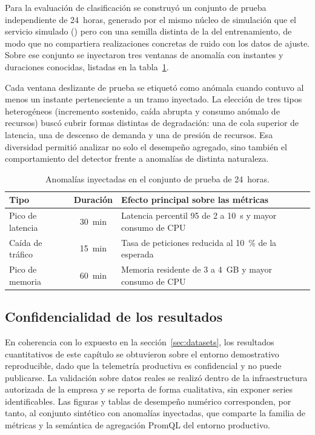 Para la evaluación de clasificación se construyó un conjunto de prueba independiente de 24~horas, generado por el mismo núcleo de simulación que el servicio simulado () pero con una semilla distinta de la del entrenamiento, de modo que no compartiera realizaciones concretas de ruido con los datos de ajuste. Sobre ese conjunto se inyectaron tres ventanas de anomalía con instantes y duraciones conocidas, listadas en la tabla~\ref{tab:anomalias-inyectadas}.

Cada ventana deslizante de prueba se etiquetó como anómala cuando contuvo al menos un instante perteneciente a un tramo inyectado. La elección de tres tipos heterogéneos (incremento sostenido, caída abrupta y consumo anómalo de recursos) buscó cubrir formas distintas de degradación: una de cola superior de latencia, una de descenso de demanda y una de presión de recursos. Esa diversidad permitió analizar no solo el desempeño agregado, sino también el comportamiento del detector frente a anomalías de distinta naturaleza.

\begin{table}[H]
\centering
\small
\caption{Anomalías inyectadas en el conjunto de prueba de 24~horas.}
\label{tab:anomalias-inyectadas}
\begin{tabular}{@{}>{\raggedright\arraybackslash}p{}cp{}@{}}
\toprule
\textbf{Tipo} & \textbf{Duración} & \textbf{Efecto principal sobre las métricas} \\
\midrule
Pico de latencia & 30~min & Latencia percentil 95 de 2 a 10~s y mayor consumo de CPU \\
Caída de tráfico & 15~min & Tasa de peticiones reducida al 10~\% de la esperada \\
Pico de memoria & 60~min & Memoria residente de 3 a 4~GB y mayor consumo de CPU \\
\bottomrule
\end{tabular}
\end{table}

\subsection{Confidencialidad de los resultados}

En coherencia con lo expuesto en la sección~\ref{sec:datasets}, los resultados cuantitativos de este capítulo se obtuvieron sobre el entorno demostrativo reproducible, dado que la telemetría productiva es confidencial y no puede publicarse. La validación sobre datos reales se realizó dentro de la infraestructura autorizada de la empresa y se reporta de forma cualitativa, sin exponer series identificables. Las figuras y tablas de desempeño numérico corresponden, por tanto, al conjunto sintético con anomalías inyectadas, que comparte la familia de métricas y la semántica de agregación PromQL del entorno productivo.

